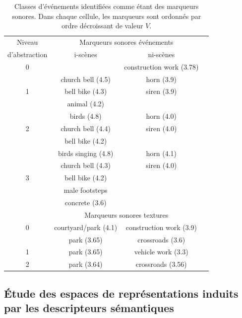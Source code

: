\begin{table}[t]
 \setlength{\tabcolsep}{0.2pt}
 \centering
  {\renewcommand{\arraystretch}{0.9}
\begin{tabular}{c c c c} 
Niveau        & \multicolumn{2}{c}{Marqueurs sonores événements} \\
d'abstraction & i-scènes & ni-scènes \\
\hline
0  &                               &  construction work (3.78)  \\
\hline
  & church bell  (4.5)             & horn  (3.9) \\
1 & bell bike    (4.3)             & siren (3.9)\\
  & animal       (4.2)             &       \\
   \hline
  & birds        (4.8)             & horn  (4.0)\\
2 & church bell  (4.4)             & siren (4.0)\\
  & bell bike    (4.2)             &       \\
   \hline
  & birds singing (4.8)            & horn  (4.1)\\
  & church bell   (4.3)            & siren (4.0)\\
3 & bell bike     (4.2)            &       \\
  & male footsteps                 &  \\
  &   concrete (3.6)               &  \\
  \hline
  \hline
          & \multicolumn{2}{c}{Marqueurs sonores textures}      \\
\hline
0         &     courtyard/park (4.1) &  construction work (3.9)  \\
\hline
          &     park (3.65)           &  crossroads (3.6)  \\
1         &     park (3.65)           &  vehicle work (3.3)  \\
\hline
2         &     park (3.64)           &  crossroads (3.56)  \\
\end{tabular}
}
\vspace{0.5mm}
\caption[Classes d'événements identifiées comme étant des marqueurs sonores]{Classes d'événements identifiées comme étant des marqueurs sonores. Dans chaque cellule, les marqueurs sont ordonnés par ordre décroissant de valeur $V$.}
\label{tab:markers}
\end{table}

\subsection{Étude des espaces de représentations induits par les descripteurs sémantiques}

